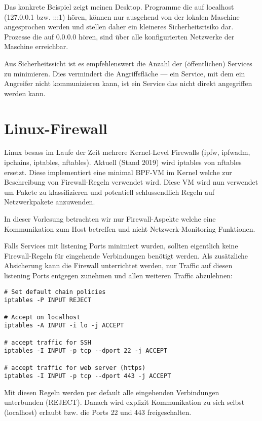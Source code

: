 Das konkrete Beispiel zeigt meinen Desktop. Programme die auf localhost (127.0.0.1 bzw. :::1) hören, können nur ausgehend von der lokalen Maschine angesprochen werden und stellen daher ein kleineres Sicherheitsrisiko dar. Prozesse die auf 0.0.0.0 hören, sind über alle konfigurierten Netzwerke der Maschine erreichbar.

Aus Sicherheitssicht ist es empfehlenswert die Anzahl der (öffentlichen) Services zu minimieren. Dies vermindert die Angriffsfläche --- ein Service, mit dem ein Angreifer nicht kommunizieren kann, ist ein Service das nicht direkt angegriffen werden kann.

\section{Linux-Firewall}

Linux besass im Laufe der Zeit mehrere Kernel-Level Firewalls (ipfw, ipfwadm, ipchains, iptables, nftables). Aktuell (Stand 2019) wird iptables von nftables ersetzt. Diese implementiert eine minimal BPF-VM im Kernel welche zur Beschreibung von Firewall-Regeln verwendet wird. Diese VM wird nun verwendet um Pakete zu klassifizieren und potentiell schlussendlich Regeln auf Netzwerkpakete anzuwenden.

In dieser Vorlesung betrachten wir nur Firewall-Aspekte welche eine Kommunikation zum Host betreffen und nicht Netzwerk-Monitoring Funktionen.

Falls Services mit listening Ports minimiert wurden, sollten eigentlich keine Firewall-Regeln für eingehende Verbindungen benötigt werden. Als zusätzliche Absicherung kann die Firewall unterrichtet werden, nur Traffic auf diesen listening Ports entgegen zunehmen und allen weiteren Traffic abzulehnen:

\begin{verbatim}
# Set default chain policies
iptables -P INPUT REJECT

# Accept on localhost
iptables -A INPUT -i lo -j ACCEPT

# accept traffic for SSH
iptables -I INPUT -p tcp --dport 22 -j ACCEPT

# accept traffic for web server (https)
iptables -I INPUT -p tcp --dport 443 -j ACCEPT
\end{verbatim}

Mit diesen Regeln werden per default alle eingehenden Verbindungen unterbunden (REJECT). Danach wird explizit Kommunikation zu sich selbst (localhost) erlaubt bzw. die Ports 22 und 443 freigeschalten.


